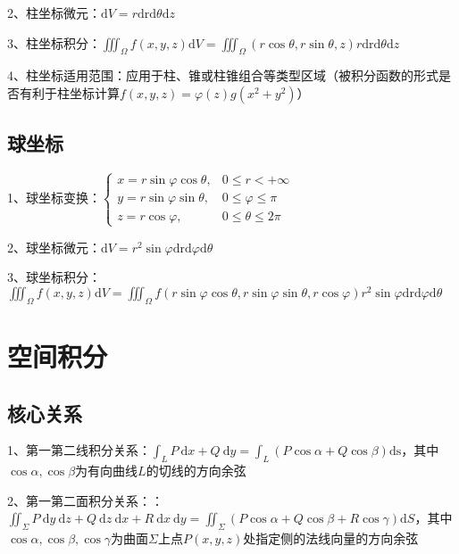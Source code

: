 2、柱坐标微元：$\mathrm{d} V=r \mathrm{drd} \theta \mathrm{d} z$

3、柱坐标积分：$\iiint_{\Omega} f(x, y, z) \mathrm{d} V=\iiint_{\Omega}(r \cos \theta, r \sin \theta, z) r \mathrm{drd} \theta \mathrm{d} z$

4、柱坐标适用范围：应用于柱、锥或柱锥组合等类型区域（被积分函数的形式是否有利于柱坐标计算$f(x, y, z)=\varphi(z) g\left(x^{2}+y^{2}\right)$）



\subsection{球坐标}

1、球坐标变换：$\begin{cases}x=r \sin \varphi \cos \theta, & 0 \leqslant r<+\infty \\ y=r \sin \varphi \sin \theta, & 0 \leqslant \varphi \leqslant \pi \\ z=r \cos \varphi, & 0 \leqslant \theta \leqslant 2 \pi\end{cases}$

2、球坐标微元：$\mathrm{d} V=r^{2} \sin \varphi \mathrm{drd} \varphi \mathrm{d} \theta$

3、球坐标积分：$\iiint_{\Omega} f(x, y, z) \mathrm{d} V=\iiint_{\Omega} f(r \sin \varphi \cos \theta, r \sin \varphi \sin \theta, r \cos \varphi) r^{2} \sin \varphi \mathrm{drd} \varphi \mathrm{d} \theta$

\section{空间积分}



\subsection{核心关系}

1、第一第二线积分关系：$\int_{L} P \mathrm{~d} x+Q \mathrm{~d} y=\int_{L}(P \cos \alpha+Q \cos \beta) \mathrm{ds}$，其中$\cos \alpha, \cos \beta$为有向曲线$L$的切线的方向余弦

2、第一第二面积分关系：：$\iint_{\Sigma} P \mathrm{~d} y \mathrm{~d} z+Q \mathrm{~d} z \mathrm{~d} x+R \mathrm{~d} x \mathrm{~d} y=\iint_{\Sigma}(P \cos \alpha+Q \cos \beta+R \cos \gamma) \mathrm{d} S$，其中$\cos \alpha, \cos \beta, \cos \gamma$为曲面$\Sigma$上点$P(x, y, z)$处指定侧的法线向量的方向余弦



